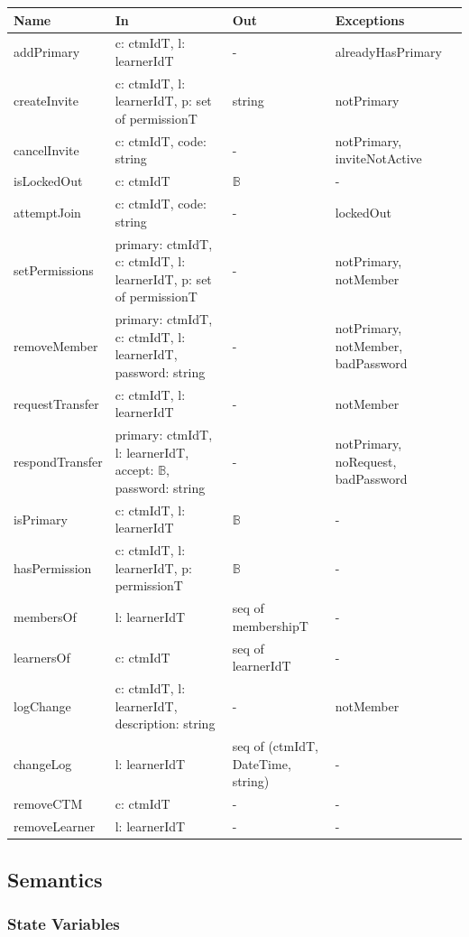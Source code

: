 \documentclass[12pt, titlepage]{article}
\begin{document}
\begin{center}
\small
\begin{tabular}{p{3.3cm} p{4.7cm} p{2.6cm} p{2.8cm}}
\hline
\textbf{Name} & \textbf{In} & \textbf{Out} & \textbf{Exceptions} \\
\hline
addPrimary & c: ctmIdT, l: learnerIdT & - & alreadyHasPrimary \\
createInvite & c: ctmIdT, l: learnerIdT, p: set of permissionT & string & notPrimary \\
cancelInvite & c: ctmIdT, code: string & - & notPrimary, inviteNotActive \\
isLockedOut & c: ctmIdT & $\mathbb{B}$ & - \\
attemptJoin & c: ctmIdT, code: string & - & lockedOut \\
setPermissions & primary: ctmIdT, c: ctmIdT, l: learnerIdT, p: set of permissionT & - & notPrimary, notMember \\
removeMember & primary: ctmIdT, c: ctmIdT, l: learnerIdT, password: string & - & notPrimary, notMember, badPassword \\
requestTransfer & c: ctmIdT, l: learnerIdT & - & notMember \\
respondTransfer & primary: ctmIdT, l: learnerIdT, accept: $\mathbb{B}$, password: string & - & notPrimary, noRequest, badPassword \\
isPrimary & c: ctmIdT, l: learnerIdT & $\mathbb{B}$ & - \\
hasPermission & c: ctmIdT, l: learnerIdT, p: permissionT & $\mathbb{B}$ & - \\
membersOf & l: learnerIdT & seq of membershipT & - \\
learnersOf & c: ctmIdT & seq of learnerIdT & - \\
logChange & c: ctmIdT, l: learnerIdT, description: string & - & notMember \\
changeLog & l: learnerIdT & seq of (ctmIdT, DateTime, string) & - \\
removeCTM & c: ctmIdT & - & - \\
removeLearner & l: learnerIdT & - & - \\
\hline
\end{tabular}
\end{center}

\subsection{Semantics}

\subsubsection{State Variables}
\end{document}

